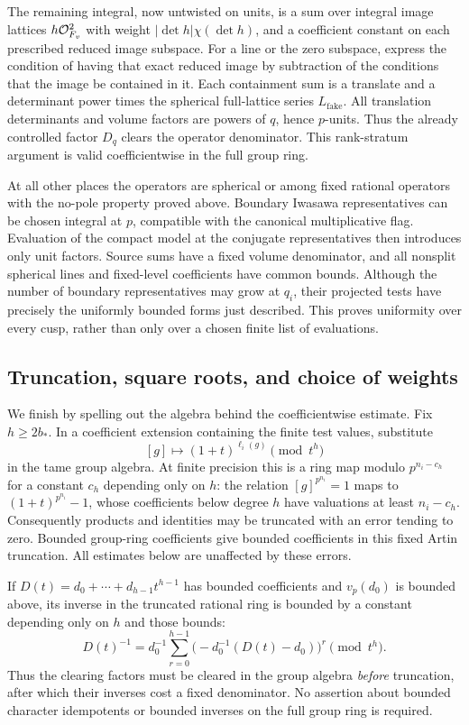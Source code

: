 The remaining integral, now untwisted on units, is a sum over integral
image lattices $h\mathcal O_{F_v}^{2}$ with weight
$|\det h|\chi(\det h)$, and a coefficient constant on each prescribed
reduced image subspace.  For a line or the zero subspace, express the
condition of having that exact reduced image by subtraction of the
conditions that the image be contained in it.  Each containment sum is
a translate and a determinant power times the spherical full-lattice
series $L_{\mathrm{fake}}$.  All translation determinants and volume
factors are powers of $q$, hence $p$-units.  Thus the already controlled
factor $D_q$ clears the operator denominator.  This rank-stratum
argument is valid coefficientwise in the full group ring.

At all other places the operators are spherical or among fixed
rational operators with the no-pole property proved above.  Boundary
Iwasawa representatives can be chosen integral at $p$, compatible with
the canonical multiplicative flag.  Evaluation of the compact model
at the conjugate representatives then introduces only unit factors.
Source sums have a fixed volume denominator, and all nonsplit
spherical lines and fixed-level coefficients have common bounds.
Although the number of boundary representatives may grow at $q_i$,
their projected tests have precisely the uniformly bounded forms just
described.  This proves uniformity over every cusp, rather than only
over a chosen finite list of evaluations.

\subsection{Truncation, square roots, and choice of weights}

We finish by spelling out the algebra behind the coefficientwise
estimate.  Fix $h\ge2b_*$.  In a coefficient extension containing the
finite test values, substitute
\[
 [g]\longmapsto(1+t)^{\ell_i(g)}\pmod {t^h}
\]
in the tame group algebra.  At finite precision this is a ring map
modulo $p^{n_i-c_h}$ for a constant $c_h$ depending only on $h$:
the relation $[g]^{p^{n_i}}=1$ maps to
$(1+t)^{p^{n_i}}-1$, whose coefficients below degree $h$ have valuations
at least $n_i-c_h$.  Consequently products and identities may be
truncated with an error tending to zero.  Bounded group-ring
coefficients give bounded coefficients in this fixed Artin
truncation.  All estimates below are unaffected by these errors.

If $D(t)=d_0+\cdots+d_{h-1}t^{h-1}$ has bounded coefficients and
$v_p(d_0)$ is bounded above, its inverse in the truncated rational ring
is bounded by a constant depending only on $h$ and those bounds:
\begin{equation}\label{eq:bounded-artin-inverse}
 D(t)^{-1}=d_0^{-1}
  \sum_{r=0}^{h-1}\bigl(-d_0^{-1}(D(t)-d_0)\bigr)^r
  \pmod {t^h}.
\end{equation}
Thus the clearing factors must be cleared in the group algebra
\emph{before} truncation, after which their inverses cost a fixed
denominator.  No assertion about bounded character idempotents or
bounded inverses on the full group ring is required.

